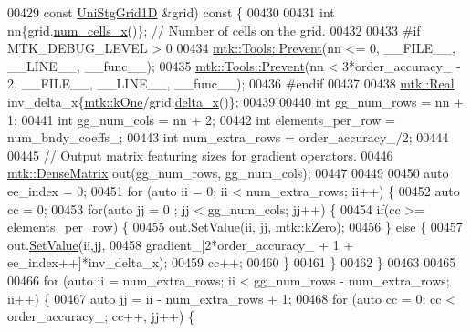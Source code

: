 \begin{DoxyCode}
{{00429   \textcolor{keyword}{const} \hyperlink{classmtk_1_1UniStgGrid1D}{UniStgGrid1D} &grid)\textcolor{keyword}{ const }\{
00430 
00431   \textcolor{keywordtype}{int} nn\{grid.\hyperlink{classmtk_1_1UniStgGrid1D_af1b3729d8afa07be5b2775ed68015b80}{num\_cells\_x}()\}; \textcolor{comment}{// Number of cells on the grid.}
00432 
00433 \textcolor{preprocessor}{  #if MTK\_DEBUG\_LEVEL > 0}
00434   \hyperlink{classmtk_1_1Tools_afe5bb096309258e2e72503fd7b41c7e0}{mtk::Tools::Prevent}(nn <= 0, \_\_FILE\_\_, \_\_LINE\_\_, \_\_func\_\_);
00435   \hyperlink{classmtk_1_1Tools_afe5bb096309258e2e72503fd7b41c7e0}{mtk::Tools::Prevent}(nn < 3*order\_accuracy\_ - 2, \_\_FILE\_\_, \_\_LINE\_\_, \_\_func\_\_);
00436 \textcolor{preprocessor}{  #endif}
00437 
00438   \hyperlink{group__c01-roots_gac080bbbf5cbb5502c9f00405f894857d}{mtk::Real} inv\_delta\_x\{\hyperlink{group__c01-roots_ga26407c24d43b6b95480943340d285c71}{mtk::kOne}/grid.\hyperlink{classmtk_1_1UniStgGrid1D_a6e7173b01241632cf509496d66b9f74c}{delta\_x}()\};
00439 
00440   \textcolor{keywordtype}{int} gg\_num\_rows = nn + 1;
00441   \textcolor{keywordtype}{int} gg\_num\_cols = nn + 2;
00442   \textcolor{keywordtype}{int} elements\_per\_row = num\_bndy\_coeffs\_;
00443   \textcolor{keywordtype}{int} num\_extra\_rows = order\_accuracy\_/2;
00444 
00445   \textcolor{comment}{// Output matrix featuring sizes for gradient operators.}
00446   \hyperlink{classmtk_1_1DenseMatrix}{mtk::DenseMatrix} out(gg\_num\_rows, gg\_num\_cols);
00447 
00449 
00450   \textcolor{keyword}{auto} ee\_index = 0;
00451   \textcolor{keywordflow}{for} (\textcolor{keyword}{auto} ii = 0; ii < num\_extra\_rows; ii++) \{
00452     \textcolor{keyword}{auto} cc = 0;
00453     \textcolor{keywordflow}{for}(\textcolor{keyword}{auto} jj = 0 ; jj < gg\_num\_cols; jj++) \{
00454       \textcolor{keywordflow}{if}(cc >= elements\_per\_row) \{
00455         out.\hyperlink{classmtk_1_1DenseMatrix_ae0f873a6d3a734da467cafb817da64ae}{SetValue}(ii, jj, \hyperlink{group__c01-roots_ga59a451a5fae30d59649bcda274fea271}{mtk::kZero});
00456       \} \textcolor{keywordflow}{else} \{
00457         out.\hyperlink{classmtk_1_1DenseMatrix_ae0f873a6d3a734da467cafb817da64ae}{SetValue}(ii,jj,
00458                      gradient\_[2*order\_accuracy\_ + 1 + ee\_index++]*inv\_delta\_x);
00459         cc++;
00460       \}
00461     \}
00462   \}
00463 
00465 
00466   \textcolor{keywordflow}{for} (\textcolor{keyword}{auto} ii = num\_extra\_rows; ii < gg\_num\_rows - num\_extra\_rows; ii++) \{
00467     \textcolor{keyword}{auto} jj = ii - num\_extra\_rows + 1;
00468     \textcolor{keywordflow}{for} (\textcolor{keyword}{auto} cc = 0; cc < order\_accuracy\_; cc++, jj++) \{
}}
\end{DoxyCode}
